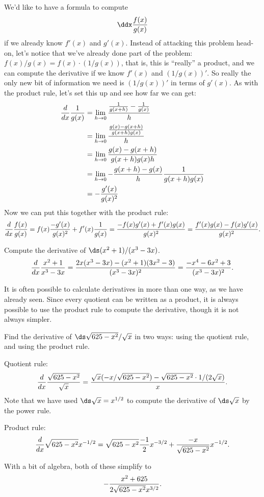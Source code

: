 We'd like to have a formula to compute
\[
\ddx \frac{f(x)}{g(x)}
\]
if we already know $f'(x)$ and $g'(x)$. Instead of attacking this
problem head-on, let's notice that we've already done part of the
problem: $f(x)/g(x)= f(x)\cdot(1/g(x))$, that is, this is ``really'' a
product, and we can compute the derivative if we know $f'(x)$ and
$(1/g(x))'$. So really the only new bit of information we need is
$(1/g(x))'$ in terms of $g'(x)$. As with the product rule, let's set
this up and see how far we can get:
\begin{align*}
{d\over dx}{1\over g(x)}&=\lim_{h\to0} 
{{1\over g(x+h)}-{1\over g(x)}\over h} \\
&=\lim_{h\to0} {{g(x)-g(x+h)\over g(x+h)g(x)}\over h} \\
&=\lim_{h\to0} {g(x)-g(x+h)\over g(x+h)g(x)h} \\
&=\lim_{h\to0} -{g(x+h)-g(x)\over h}
 {1\over g(x+h)g(x)} \\
&=-{g'(x)\over g(x)^2} \\
\end{align*}
Now we can put this together with the product rule:
$${d\over dx}{f(x)\over g(x)}=f(x){-g'(x)\over g(x)^2}+f'(x){1\over
  g(x)}={-f(x)g'(x)+f'(x)g(x)\over g(x)^2}=
  {f'(x)g(x)-f(x)g'(x)\over g(x)^2}.
$$

\begin{example}
Compute the derivative of $\ds (x^2+1)/(x^3-3x)$.
$${d\over dx}{x^2+1\over
  x^3-3x}={2x(x^3-3x)-(x^2+1)(3x^2-3)\over(x^3-3x)^2}=
  {-x^4-6x^2+3\over (x^3-3x)^2}.
$$

\end{example}

It is often possible to calculate derivatives in more than one way, as
we have already seen. Since every quotient can be written as a
product, it is always possible to use the product rule to compute the
derivative, though it is not always simpler.

\begin{example}
Find the derivative of $\ds \sqrt{625-x^2}/\sqrt{x}$ in two ways: using the
quotient rule, and using the product rule.

Quotient rule:
$${d\over dx}{\sqrt{625-x^2}\over\sqrt{x}} = 
{\sqrt{x}(-x/\sqrt{625-x^2})-\sqrt{625-x^2}\cdot 1/(2\sqrt{x})\over
x}.$$
Note that we have used $\ds \sqrt{x}=x^{1/2}$ to compute the derivative of
$\ds \sqrt{x}$ by the power rule.

Product rule:
$${d\over dx}\sqrt{625-x^2} x^{-1/2} = 
\sqrt{625-x^2} {-1\over 2}x^{-3/2}+{-x\over \sqrt{625-x^2}}x^{-1/2}.
$$

With a bit of algebra, both of these simplify to
$$-{x^2+625\over 2\sqrt{625-x^2}x^{3/2}}.$$

\end{example}


